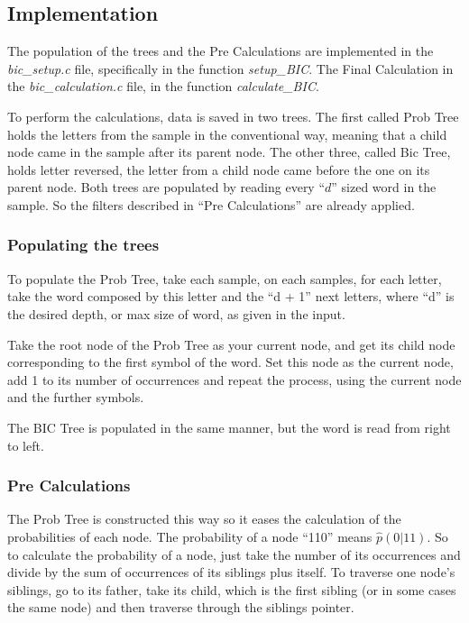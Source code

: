 \documentclass[brazil,11pt]{article}
\begin{document}
\subsection{Implementation}

The population of the trees and the Pre Calculations are implemented in the \emph{bic\_setup.c} file, specifically in the function \emph{setup\_BIC}. The Final Calculation in the \emph{bic\_calculation.c} file, in the function \emph{calculate\_BIC}.

To perform the calculations, data is saved in two trees. The first called Prob Tree holds the letters from the sample in the conventional way, meaning that a child node came in the sample after its parent node. The other three, called Bic Tree, holds letter reversed, the letter from a child node came before the one on its parent node. Both trees are populated by reading every ``$d$'' sized word in the sample. So the filters described in ``Pre Calculations'' are already applied.

\subsubsection{Populating the trees}

To populate the Prob Tree, take each sample, on each samples, for each letter, take the word composed by this letter and the ``d + 1'' next letters, where ``d'' is the desired depth, or max size of word, as given in the input.

Take the root node of the Prob Tree as your current node, and get its child node corresponding to the first symbol of the word. Set this node as the current node, add 1 to its number of occurrences and repeat the process, using the current node and the further symbols.

The BIC Tree is populated in the same manner, but the word is read from right to left.

\subsubsection{Pre Calculations}

The Prob Tree is constructed this way so it eases the calculation of the probabilities of each node. The probability of a node ``110'' means $\hat{p}(0|11)$. So to calculate the probability of a node, just take the number of its occurrences and divide by the sum of occurrences of its siblings plus itself. To traverse one node's siblings, go to its father, take its child, which is the first sibling (or in some cases the same node) and then traverse through the siblings pointer.
\end{document}
